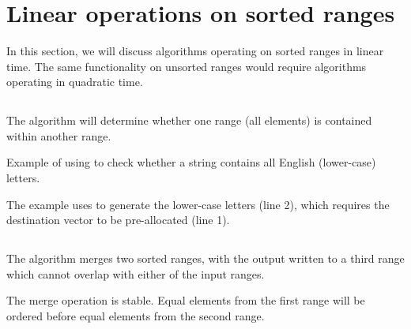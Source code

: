 \section{Linear operations on sorted ranges}

In this section, we will discuss algorithms operating on sorted ranges in linear time. The same functionality on unsorted ranges would require algorithms operating in quadratic time.

\subsection{\texorpdfstring{}{\texttt{std::includes}}}

The  algorithm will determine whether one range (all elements) is contained within another range.


\begin{codebox}[breakable]{\href{https://compiler-explorer.com/z/od9oa6xEP}{\ExternalLink}}
\footnotesize Example of using  to check whether a string contains all English (lower-case) letters.
\tcblower
{}
\end{codebox}

The example uses  to generate the lower-case letters (line 2), which requires the destination vector to be pre-allocated (line 1).

\subsection{\texorpdfstring{}{\texttt{std::merge}}}

The  algorithm merges two sorted ranges, with the output written to a third range which cannot overlap with either of the input ranges.


The merge operation is stable. Equal elements from the first range will be ordered before equal elements from the second range.

